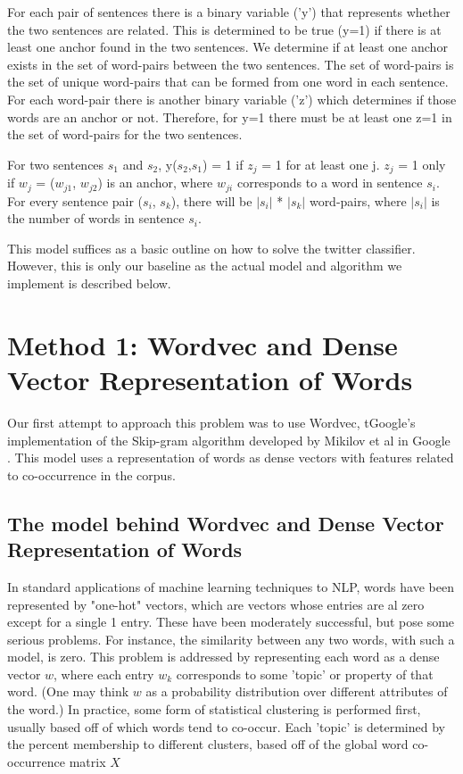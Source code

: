 \documentclass[conference]{IEEEtran}
\begin{document}
For each pair of sentences there is a binary variable ('y') that represents whether the two sentences are related. This is determined to be true (y=1) if there is at least one anchor found in the two sentences. We determine if at least one anchor exists in the set of word-pairs between the two sentences. The set of word-pairs is the set of unique word-pairs that can be formed from one word in each sentence. For each word-pair there is another binary variable ('z') which determines if those words are an anchor or not. Therefore, for y=1 there must be at least one z=1 in the set of word-pairs for the two sentences.  \medskip


For two sentences $s_{1}$ and $s_{2}$, y($s_{2}$,$s_{1}$) = 1 
if $z_{j}$ = 1 for at least one j. $z_{j}$ = 1 only if $w_{j}$ = ($w_{j1}$, $w_{j2}$) is an anchor, where $w_{ji}$ corresponds to a word in sentence $s_{i}$. For every sentence pair ($s_{i}$, $s_{k}$), there will be $|s_{i}|$ * $|s_{k}|$ word-pairs, where $|s_{i}|$ is the number of words in sentence $s_{i}$. \medskip

This model suffices as a basic outline on how to solve the twitter classifier. However, this is only our baseline as the actual model and algorithm we implement is described below.
 
\section{Method 1: Wordvec and Dense Vector Representation of Words}
Our first attempt to approach this problem was to use Wordvec, tGoogle's implementation of the Skip-gram algorithm developed by Mikilov et al in Google \cite{Mikolov}. This model uses a representation of words as dense vectors with features related to co-occurrence in the corpus.

\subsection{The model behind Wordvec and Dense Vector Representation of Words}
In standard applications of machine learning techniques to NLP, words have been represented by "one-hot" vectors, which are vectors whose entries are al zero except for a single 1 entry. These have been moderately successful, but pose some serious problems. For instance, the similarity between any two words, with such a model, is zero. This problem is addressed by representing each word as a dense vector $w$, where each entry $w_k$ corresponds to some 'topic' or property of that word. (One may think $w$ as a probability distribution over different attributes of the word.) In practice, some form of statistical clustering is performed first, usually based off of which words tend to co-occur. Each 'topic' is determined by the percent membership to different clusters, based off of the global word co-occurrence matrix $X$ \cite{Wordvec}\\
\end{document}
